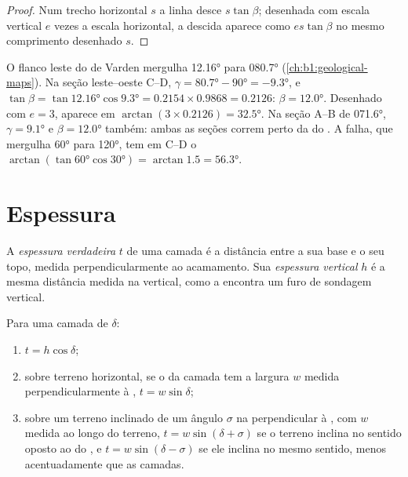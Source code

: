 \begin{proof}
Num trecho horizontal $s$ a linha desce $s\tan\beta$; desenhada com escala vertical $e$ vezes a escala horizontal, a descida aparece como $es\tan\beta$ no mesmo comprimento desenhado $s$.
\end{proof}

\begin{example}
O flanco leste do  de Varden mergulha \ang{12.16} para \ang{080.7}
(\cref{ch:b1:geological-maps}). Na seção leste--oeste C--D,
$\gamma = \ang{80.7} - \ang{90} = \ang{-9.3}$, e $\tan\beta =
\tan\ang{12.16}\cos\ang{9.3} = 0.2154\times0.9868 = 0.2126$: $\beta =
\ang{12.0}$. Desenhado com $e = 3$, aparece em $\arctan(3\times0.2126) =
\ang{32.5}$. Na seção A--B de  \ang{071.6}, $\gamma = \ang{9.1}$
e $\beta = \ang{12.0}$ também: ambas as seções correm perto da  do
. A falha, que mergulha \ang{60} para \ang{120}, tem em C--D o
 $\arctan(\tan\ang{60}\cos\ang{30}) = \arctan 1.5 = \ang{56.3}$.
\end{example}

\section{Espessura}

\begin{definition}\label{def:b1:cross-sections:thickness}
A \emph{espessura verdadeira} $t$ de uma camada é a distância entre a sua base e o seu topo, medida perpendicularmente ao acamamento. Sua \emph{espessura vertical} $h$ é a mesma distância medida na vertical, como a encontra um furo de sondagem vertical.
\end{definition}

\begin{proposition}\label{prop:b1:cross-sections:thickness}
Para uma camada de  $\delta$:
\begin{enumerate}
  \item $t = h\cos\delta$;
  \item sobre terreno horizontal, se o  da camada tem a largura $w$
        medida perpendicularmente à , $t = w\sin\delta$;
  \item sobre um terreno inclinado de um ângulo $\sigma$ na  perpendicular à , com $w$ medida ao longo do terreno,
        $t = w\sin(\delta + \sigma)$ se o terreno inclina no sentido oposto ao do , e $t = w\sin(\delta - \sigma)$ se ele inclina no mesmo sentido, menos acentuadamente que as camadas.
\end{enumerate}
\end{proposition}


